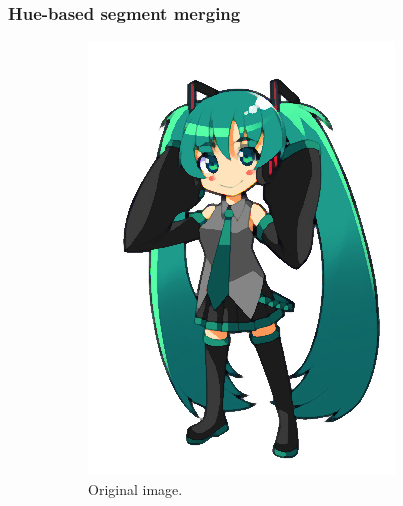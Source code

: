 \subsubsection{Hue-based segment merging}
\label{sec:hueMerging}

\begin{figure}[htb!]
\centering
\begin{subfigure}{0.3\textwidth}
\includegraphics[width=\textwidth]{images/miku_a.png}
\caption{Original image.}
\end{subfigure}
\begin{subfigure}{0.3\textwidth}

\end{subfigure}
\end{figure}
